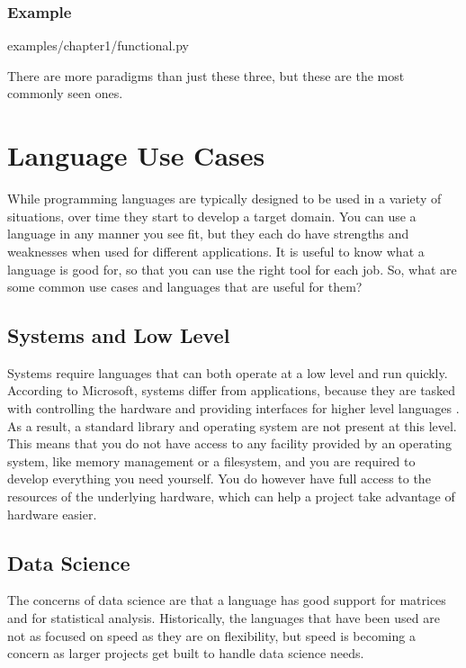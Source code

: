 \documentclass[12pt, oneside, a4paper]{book}
\begin{document}

         \subsubsection{Example}
         
         {examples/chapter1/functional.py}

         There are more paradigms than just these three, but these are the most commonly seen ones.

         \section{Language Use Cases}
         While programming languages are typically designed to be used in a variety of situations, over time they start to develop a target domain.
         You can use a language in any manner you see fit, but they each do have strengths and weaknesses when used for different applications.
         It is useful to know what a language is good for, so that you can use the right tool for each job.
         So, what are some common use cases and languages that are useful for them?

         \subsection{Systems and Low Level}
         Systems require languages that can both operate at a low level and run quickly.
         According to Microsoft, systems differ from applications, because they are tasked with controlling the hardware and providing interfaces for higher level languages \autocite{microsoftPanelSystemsProgramming2014}.
         As a result, a standard library and operating system are not present at this level.
         This means that you do not have access to any facility provided by an operating system, like memory management or a filesystem, and you are required to develop everything you need yourself.
         You do however have full access to the resources of the underlying hardware, which can help a project take advantage of hardware easier.

         \subsection{Data Science}
         The concerns of data science are that a language has good support for matrices and for statistical analysis.
         Historically, the languages that have been used are not as focused on speed as they are on flexibility, but speed is becoming a concern as larger projects get built to handle data science needs.
\end{document}
